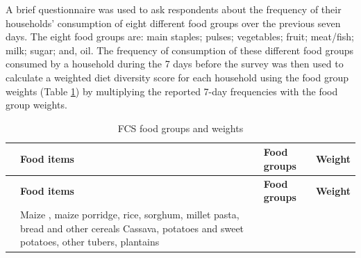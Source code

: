 \documentclass[12pt,a4paper]{article}
\begin{document}
A brief questionnaire was used to ask respondents about the frequency of their households' consumption of eight different food groups over the previous seven days. The eight food groups are: main staples; pulses; vegetables; fruit; meat/fish; milk; sugar; and, oil. The frequency of consumption of these different food groups consumed by a household during the 7 days before the survey was then used to calculate a weighted diet diversity score for each household using the food group weights (Table \ref{tab:fcsWeights}) by multiplying the reported 7-day frequencies with the food group weights.

\begin{longtable}[]{@{}cllr@{}}
\caption{\label{tab:fcsWeights} FCS food groups and weights}\tabularnewline
\toprule
\begin{minipage}[b]{0.07\columnwidth}\centering
\strut
\end{minipage} & \begin{minipage}[b]{0.47\columnwidth}\raggedright
\textbf{Food items}\strut
\end{minipage} & \begin{minipage}[b]{0.20\columnwidth}\raggedright
\textbf{Food groups}\strut
\end{minipage} & \begin{minipage}[b]{0.15\columnwidth}\raggedleft
\textbf{Weight}\strut
\end{minipage}\tabularnewline
\midrule
\endfirsthead
\toprule
\begin{minipage}[b]{0.07\columnwidth}\centering
\strut
\end{minipage} & \begin{minipage}[b]{0.47\columnwidth}\raggedright
\textbf{Food items}\strut
\end{minipage} & \begin{minipage}[b]{0.20\columnwidth}\raggedright
\textbf{Food groups}\strut
\end{minipage} & \begin{minipage}[b]{0.15\columnwidth}\raggedleft
\textbf{Weight}\strut
\end{minipage}\tabularnewline
\midrule
\endhead
\begin{minipage}[t]{0.07\columnwidth}\centering
1\strut
\end{minipage} & \begin{minipage}[t]{0.47\columnwidth}\raggedright
Maize , maize porridge, rice, sorghum,
millet pasta, bread and other cereals
Cassava, potatoes and sweet potatoes,
other tubers, plantains\strut
\end{minipage} & \begin{minipage}[t]{0.20\columnwidth}\raggedright

\end{minipage}
\end{longtable}
\end{document}

